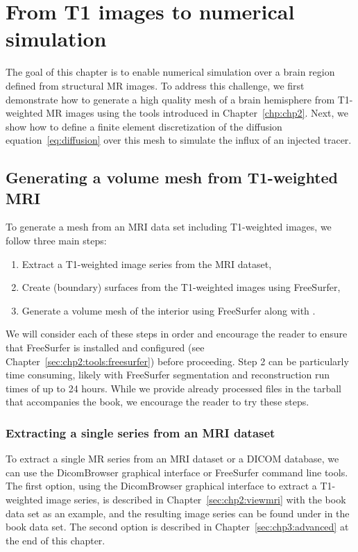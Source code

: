 \chapter{From T1 images to numerical simulation}
\label{chp:chp3}

The goal of this chapter is to enable numerical simulation over a
brain region defined from structural MR images. To address this
challenge, we first demonstrate how to generate a high quality mesh of
a brain hemisphere from T1-weighted MR images using the tools
introduced in Chapter~\ref{chp:chp2}. Next, we show how to define a
finite element discretization of the diffusion
equation~\eqref{eq:diffusion} over this mesh to simulate the influx of
an injected tracer.

\section{Generating a volume mesh from T1-weighted MRI}
\label{sec:chp3:tools}

To generate a mesh from an MRI data set including T1-weighted images,
we follow three main steps:
\begin{enumerate}
\item
  Extract a T1-weighted image series from the MRI dataset,
\item
  Create (boundary) surfaces from the T1-weighted images using FreeSurfer,
\item
  Generate a volume mesh of the interior using FreeSurfer along with \svmtk.
\end{enumerate}
We will consider each of these steps in order and encourage the
reader to ensure that FreeSurfer is installed and configured (see
Chapter~\ref{sec:chp2:tools:freesurfer}) before proceeding. Step 2 can
be particularly time consuming, likely with FreeSurfer segmentation
and reconstruction run times of up to 24 hours.
While we provide already processed files in the tarball that accompanies
the book, we encourage the reader to try these steps.
 
\subsection{Extracting a single series from an MRI dataset}

To extract a single MR series from an MRI dataset or a DICOM database,
we can use the DicomBrowser graphical interface or FreeSurfer command
line tools. The first option, using the DicomBrowser graphical
interface to extract a T1-weighted image series, is described in
Chapter~\ref{sec:chp2:viewmri} with the book data set as an example,
and the resulting image series can be found under  in
the book data set. The second option is described in
Chapter~\ref{sec:chp3:advanced} at the end of this chapter.

